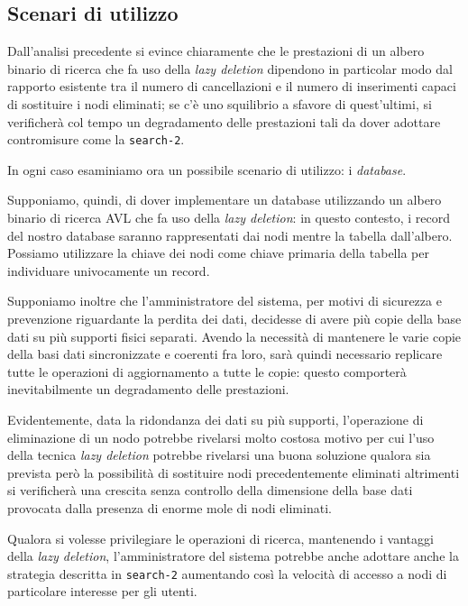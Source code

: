 \documentclass[10pt,a4paper,titlepage]{article}
\begin{document}
\subsection{Scenari di utilizzo}

Dall'analisi precedente si evince chiaramente che le prestazioni di un albero binario di ricerca che fa uso della \textit{lazy deletion} dipendono in particolar modo dal rapporto esistente tra il numero di cancellazioni e il numero di inserimenti capaci di sostituire i nodi eliminati; se c'è uno squilibrio a sfavore di quest'ultimi, si verificherà col tempo un degradamento delle prestazioni tali da dover adottare contromisure come la \texttt{search-2}.

In ogni caso esaminiamo ora un possibile scenario di utilizzo: i \textit{database}.

Supponiamo, quindi, di dover implementare un database utilizzando un albero binario di ricerca AVL che fa uso della \textit{lazy deletion}: in questo contesto, i record del nostro database saranno rappresentati dai nodi mentre la tabella dall'albero. Possiamo utilizzare la chiave dei nodi come chiave primaria della tabella per individuare univocamente un record.

Supponiamo inoltre che l'amministratore del sistema, per motivi di sicurezza e prevenzione riguardante la perdita dei dati, decidesse di avere più copie della base dati su più supporti fisici separati. Avendo la necessità di mantenere le varie copie della basi dati sincronizzate e coerenti fra loro, sarà quindi necessario replicare tutte le operazioni di aggiornamento a tutte le copie: questo comporterà inevitabilmente un degradamento delle prestazioni. 

Evidentemente, data la ridondanza dei dati su più supporti, l'operazione di eliminazione di un nodo potrebbe rivelarsi molto costosa motivo per cui l'uso della tecnica \textit{lazy deletion} potrebbe rivelarsi una buona soluzione qualora sia prevista però la possibilità di sostituire nodi precedentemente eliminati altrimenti si verificherà una crescita senza controllo della dimensione della base dati provocata dalla presenza di enorme mole di nodi eliminati.

Qualora si volesse privilegiare le operazioni di ricerca, mantenendo i vantaggi della \textit{lazy deletion}, l'amministratore del sistema potrebbe anche adottare anche la strategia descritta in \texttt{search-2} aumentando così la velocità di accesso a nodi di particolare interesse per gli utenti.
\end{document}
